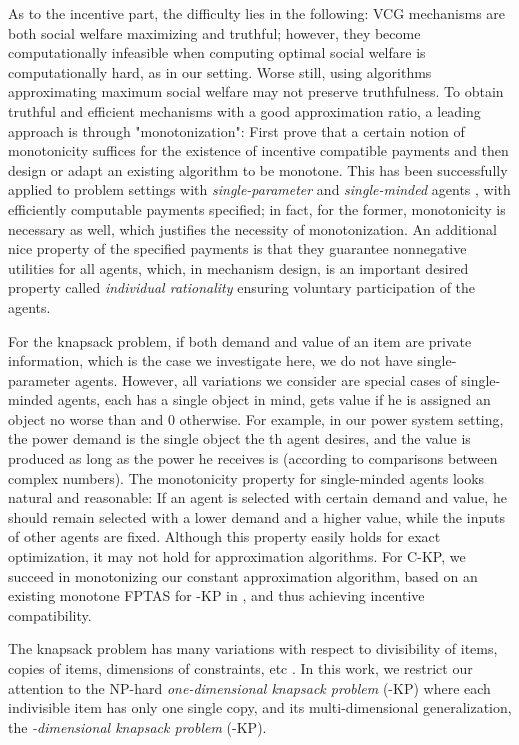 \documentclass{aamas2013}
\begin{document}
As to the incentive part, the difficulty lies in the following: VCG mechanisms \cite{N07book} are both social welfare maximizing and truthful; however, they become computationally infeasible when computing optimal social welfare is computationally hard, as in our setting.  Worse still, using algorithms approximating maximum social welfare may not preserve truthfulness.  
To obtain truthful and efficient mechanisms with a good approximation ratio, a leading approach is through "monotonization": First prove that a certain notion of monotonicity suffices for the existence of incentive compatible payments and then design or adapt an existing algorithm to be monotone.  This has been successfully applied to problem settings with {\em single-parameter} \cite{archer2001truthful} and {\em single-minded} agents \cite{LOS99mono}, with efficiently computable payments specified; in fact, for the former, monotonicity is necessary as well, which justifies the necessity of monotonization.  An additional nice property of the specified payments is that they guarantee nonnegative utilities for all agents, which, in mechanism design, is an important desired property called {\em individual rationality} ensuring voluntary participation of the agents. 

For the knapsack problem, if both demand and value of an item are private information, which is the case we investigate here, we do not have single-parameter agents. However, all variations we consider are special cases of single-minded agents, each has a single object  in mind, gets value  if he is assigned an object no worse than  and 0 otherwise.  For example, in our power system setting, the power demand  is the single object the th agent desires, and the value  is produced as long as the power he receives is  (according to comparisons between complex numbers).  The monotonicity property for single-minded agents looks natural and reasonable: If an agent is selected with certain demand and value, he should remain selected with a lower demand and a higher value, while the inputs of other agents are fixed.  Although this property easily holds for exact optimization, 
it may not hold for approximation algorithms.   
For {\sc C-KP}, we succeed in monotonizing our constant approximation algorithm, based on an existing monotone FPTAS for {-KP} in \cite{BKV05KS}, and thus achieving incentive compatibility.



\smallskip

The knapsack problem has many variations with respect to divisibility of items, copies of items, dimensions of constraints, etc \cite{KPP10book}.
In this work, we restrict our attention to the NP-hard {\em one-dimensional knapsack problem} ({-KP}) where each indivisible item has only one single copy, and its multi-dimensional generalization, the {\em -dimensional knapsack problem} ({\sc -KP}).
\end{document}
